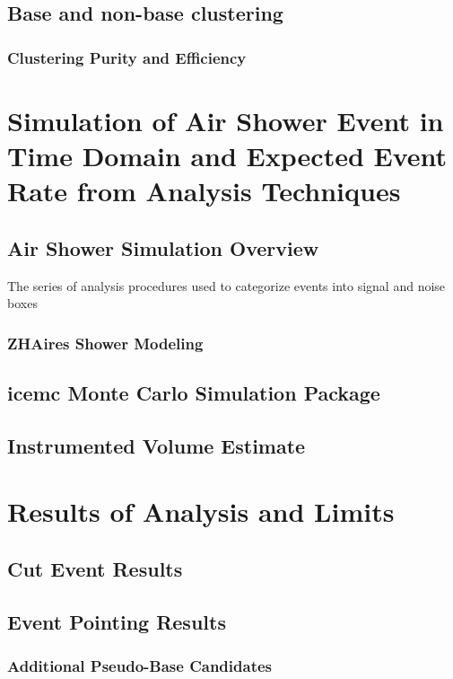 \section{Base and non-base clustering}
	\subsection{Clustering Purity and Efficiency}


	
	

\chapter{Simulation of Air Shower Event in Time Domain and Expected Event Rate from Analysis Techniques}
\section{Air Shower Simulation Overview}
	The series of analysis procedures used to categorize events into signal and noise boxes
	\subsection{ZHAires Shower Modeling}
		
\section{icemc Monte Carlo Simulation Package}
	
\section{Instrumented Volume Estimate}
			
			
\chapter{Results of Analysis and Limits}
\section{Cut Event Results}

\section{Event Pointing Results}
	\subsection{Additional Pseudo-Base Candidates}


